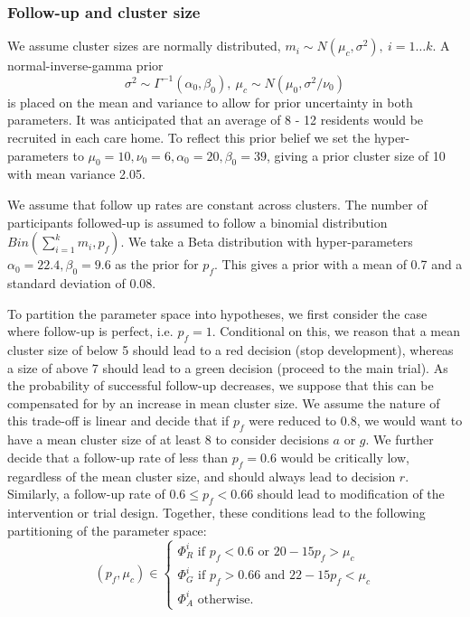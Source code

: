 \documentclass[AMA,STIX1COL]{WileyNJD-v2}
\begin{document}
\subsubsection{Follow-up and cluster size}

We assume cluster sizes are normally distributed, $m_{i} \sim N(\mu_{c}, \sigma^{2}),~ i = 1 \ldots k$. A normal-inverse-gamma prior 
\begin{equation}
\sigma^{2} \sim \Gamma^{-1} (\alpha_{0}, \beta_{0}), ~ \mu_{c} \sim N(\mu_{0}, \sigma^{2}/\nu_{0})
\end{equation}
is placed on the mean and variance to allow for prior uncertainty in both parameters. It was anticipated that an average of 8 - 12 residents would be recruited in each care home. To reflect this prior belief we set the hyper-parameters to $\mu_{0} = 10, \nu_{0} = 6, \alpha_{0} = 20, \beta_{0} = 39$, giving a prior cluster size of 10 with mean variance 2.05.

We assume that follow up rates are constant across clusters. The number of participants followed-up is assumed to follow a binomial distribution $Bin(\sum_{i=1}^{k} m_{i}, p_{f})$. We take a Beta distribution with hyper-parameters $\alpha_{0} = 22.4, \beta_{0} = 9.6$ as the prior for $p_{f}$. This gives a prior with a mean of 0.7 and a standard deviation of 0.08.

To partition the parameter space into hypotheses, we first consider the case where follow-up is perfect, i.e. $p_{f} = 1$. Conditional on this, we reason that a mean cluster size of below 5 should lead to a red decision (stop development), whereas a size of above 7 should lead to a green decision (proceed to the main trial). As the probability of successful follow-up decreases, we suppose that this can be compensated for by an increase in mean cluster size. We assume the nature of this trade-off is linear and decide that if $p_{f}$ were reduced to 0.8, we would want to have a mean cluster size of at least 8 to consider decisions $a$ or $g$.  We further decide that a follow-up rate of less than $p_{f} = 0.6$ would be critically low, regardless of the mean cluster size, and should always lead to decision $r$. Similarly, a follow-up rate of $0.6 \leq p_{f} < 0.66$ should lead to modification of the intervention or trial design. Together, these conditions lead to the following partitioning of the parameter space:
\begin{equation}
  (p_{f}, \mu_{c}) \in \begin{cases}
               \Phi^i_R \text{ if } p_{f} < 0.6 \text{ or } 20-15p_{f} > \mu_{c} \\
               \Phi^i_G \text{ if } p_{f} > 0.66 \text{ and } 22-15p_{f} < \mu_{c} \\
               \Phi^i_A \text{ otherwise.}
            \end{cases}
\end{equation}
\end{document}

